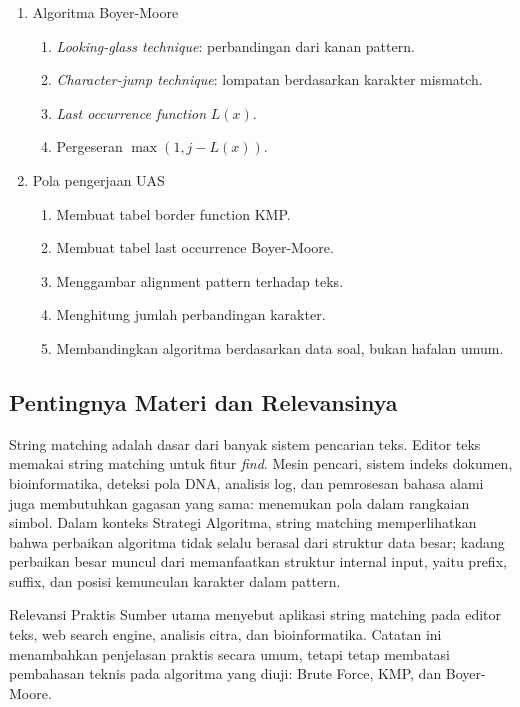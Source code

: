 \begin{enumerate}
    \item Algoritma Boyer-Moore
    \begin{enumerate}
        \item \textit{Looking-glass technique}: perbandingan dari kanan pattern.
        \item \textit{Character-jump technique}: lompatan berdasarkan karakter mismatch.
        \item \textit{Last occurrence function} $L(x)$.
        \item Pergeseran $\max(1,j-L(x))$.
    \end{enumerate}

    \item Pola pengerjaan UAS
    \begin{enumerate}
        \item Membuat tabel border function KMP.
        \item Membuat tabel last occurrence Boyer-Moore.
        \item Menggambar alignment pattern terhadap teks.
        \item Menghitung jumlah perbandingan karakter.
        \item Membandingkan algoritma berdasarkan data soal, bukan hafalan umum.
    \end{enumerate}
\end{enumerate}

\subsection{Pentingnya Materi dan Relevansinya}

String matching adalah dasar dari banyak sistem pencarian teks. Editor teks memakai string matching untuk fitur \textit{find}. Mesin pencari, sistem indeks dokumen, bioinformatika, deteksi pola DNA, analisis log, dan pemrosesan bahasa alami juga membutuhkan gagasan yang sama: menemukan pola dalam rangkaian simbol. Dalam konteks Strategi Algoritma, string matching memperlihatkan bahwa perbaikan algoritma tidak selalu berasal dari struktur data besar; kadang perbaikan besar muncul dari memanfaatkan struktur internal input, yaitu prefix, suffix, dan posisi kemunculan karakter dalam pattern.

\begin{cmt}{Relevansi Praktis}{}
Sumber utama menyebut aplikasi string matching pada editor teks, web search engine, analisis citra, dan bioinformatika. Catatan ini menambahkan penjelasan praktis secara umum, tetapi tetap membatasi pembahasan teknis pada algoritma yang diuji: Brute Force, KMP, dan Boyer-Moore.
\end{cmt}

